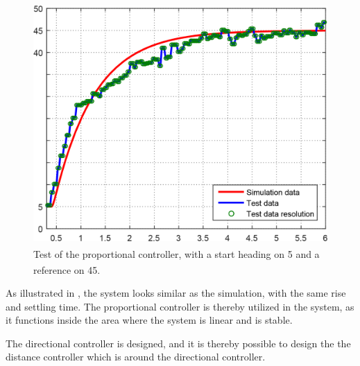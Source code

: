 \begin{figure}[H]
 	\centering
 	\includegraphics[scale=0.25]{figures/SteeringAngularTest.png}
 	\caption{Test of the proportional controller, with a start heading on \si{5^{\circ}} and a reference on \si{45^{\circ}}.}
 	\label{fig:AngularTestSim}
\end{figure}

%
As illustrated in , the system looks similar as the simulation, with the same rise and settling time. The proportional controller is thereby utilized in the system, as it functions inside the area where the system is linear and is stable.

The directional controller is designed, and it is thereby possible to design the the distance controller which is around the directional controller.